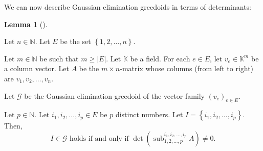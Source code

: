 \documentclass[numbers=enddot,12pt,final,onecolumn,notitlepage]{scrartcl}%
\theoremstyle{definition}
\newtheorem{lem}[theo]{Lemma}
\newenvironment{lemma}[1][]
{\begin{lem}[#1]\begin{leftbar}}
{\end{leftbar}\end{lem}}
\renewcommand{\geq}{\geqslant}
\theoremstyle{plainsl}
\begin{document}
We can now describe Gaussian elimination greedoids in terms of determinants:

\begin{lemma}
\label{lem.geg.through-det}Let $n\in\mathbb{N}$. Let $E$ be the set $\left\{
1,2,\ldots,n\right\}  $.

Let $m\in\mathbb{N}$ be such that $m\geq\left\vert E\right\vert $. Let
$\mathbb{K}$ be a field. For each $e\in E$, let $v_{e}\in\mathbb{K}^{m}$ be a
column vector. Let $A$ be the $m\times n$-matrix whose columns (from left to
right) are $v_{1},v_{2},\ldots,v_{n}$.

Let $\mathcal{G}$ be the Gaussian elimination greedoid of the vector family
$\left(  v_{e}\right)  _{e\in E}$.

Let $p\in\mathbb{N}$. Let $i_{1},i_{2},\ldots,i_{p}\in E$ be $p$ distinct
numbers. Let $I=\left\{  i_{1},i_{2},\ldots,i_{p}\right\}  $. Then,%
\[
I\in\mathcal{G}\text{ holds if and only if }\det\left(  \operatorname*{sub}%
\nolimits_{1,2,\ldots,p}^{i_{1},i_{2},\ldots,i_{p}}A\right)  \neq0.
\]

\end{lemma}
\end{document}

